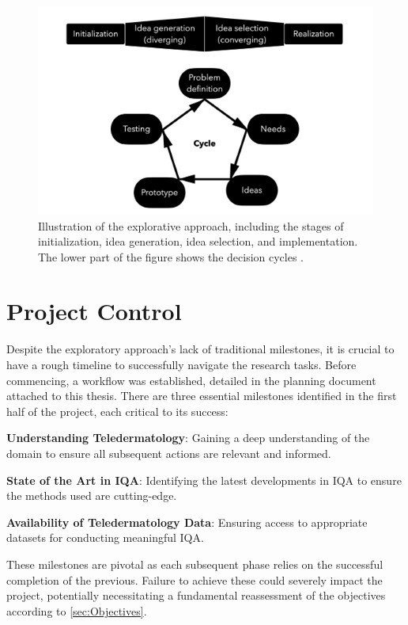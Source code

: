 \begin{figure}[ht]
    \centering
    \includegraphics[keepaspectratio,width=15cm]{img/DecisionCycle.png}
    \caption{Illustration of the explorative approach, including the stages of initialization, idea generation, idea selection, and implementation. The lower part of the figure shows the decision cycles \autocite{DesignThinking}.}
    \label{fig:decision_cycle}
\end{figure}

\section{Project Control}
\label{sec:ProjectMonitoring}
Despite the exploratory approach's lack of traditional milestones, it is crucial to have a rough timeline to successfully navigate the research tasks. Before commencing, a workflow was established, detailed in the planning document attached to this thesis. There are three essential milestones identified in the first half of the project, each critical to its success: \par
\vspace{\baselineskip}
\noindent
\textbf{Understanding Teledermatology}: Gaining a deep understanding of the domain to ensure all subsequent actions are relevant and informed. \par
\noindent
\textbf{State of the Art in IQA}: Identifying the latest developments in IQA to ensure the methods used are cutting-edge. \par
\noindent
\textbf{Availability of Teledermatology Data}:  Ensuring access to appropriate datasets for conducting meaningful IQA. \par
\vspace{\baselineskip}
\noindent
These milestones are pivotal as each subsequent phase relies on the successful completion of the previous. Failure to achieve these could severely impact the project, potentially necessitating a fundamental reassessment of the objectives according to \autoref{sec:Objectives}. \par

